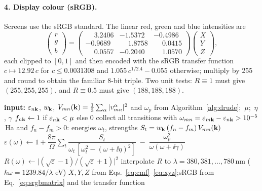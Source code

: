 \paragraph{4. Display colour (sRGB).} Screens use the sRGB standard. The
linear red, green and blue intensities are
\begin{equation}
\begin{pmatrix} r\\ g\\ b\end{pmatrix} =
\begin{pmatrix}
\phantom{-}3.2406 & -1.5372 & -0.4986\\
-0.9689 & \phantom{-}1.8758 & \phantom{-}0.0415\\
\phantom{-}0.0557 & -0.2040 & \phantom{-}1.0570
\end{pmatrix}
\begin{pmatrix} X\\ Y\\ Z\end{pmatrix},
\label{eq:srgbmatrix}
\end{equation}
each clipped to $[0,1]$ and then encoded with the sRGB transfer function
$c \mapsto 12.92\,c$ for $c\le0.0031308$ and $1.055\,c^{1/2.4}-0.055$
otherwise; multiply by 255 and round to obtain the familiar 8-bit triple.
Two unit tests: $R\equiv1$ must give $(255,255,255)$, and $R\equiv0.5$
must give $(188,188,188)$.

\begin{algorithm}[H]
\caption{Dielectric function, reflectivity and colour}
\label{alg:colour}
\begin{algorithmic}[1]
\State \textbf{input:} $\varepsilon_{n\mathbf{k}}$, $w_{\mathbf{k}}$,
$V_{mn}(\mathbf{k}) = \tfrac13\sum_\alpha|v^\alpha_{mn}|^2$ and $\omega_p$ from
Algorithm~\ref{alg:drude};\ $\mu$;\ $\eta$, $\gamma$
\State $f_{n\mathbf{k}}\gets 1$ if $\varepsilon_{n\mathbf{k}}<\mu$ else $0$
\State collect all transitions with $\omega_{mn} =
\varepsilon_{m\mathbf{k}}-\varepsilon_{n\mathbf{k}} > 10^{-5}$\,Ha and $f_n - f_m > 0$:
energies $\omega_t$, strengths $S_t = w_{\mathbf{k}}\,(f_n-f_m)\,V_{mn}(\mathbf{k})$
\State $\varepsilon(\omega) \gets 1 + \dfrac{8\pi}{\Omega}\sum_t
\dfrac{S_t}{\omega_t\,[\omega_t^2-(\omega+\ii\eta)^2]}
\;-\;\dfrac{\omega_p^2}{\omega(\omega+\ii\gamma)}$
\State $R(\omega)\gets\big|(\sqrt{\varepsilon}-1)/(\sqrt{\varepsilon}+1)\big|^2$
\EndFor
\State interpolate $R$ to $\lambda = 380,381,\dots,780$\,nm
($\hbar\omega = 1239.84/\lambda$ eV)
\State $X,Y,Z$ from Eqs.~\eqref{eq:cmf}--\eqref{eq:xyz};\quad sRGB from
Eq.~\eqref{eq:srgbmatrix} and the transfer function
\end{algorithmic}
\end{algorithm}

